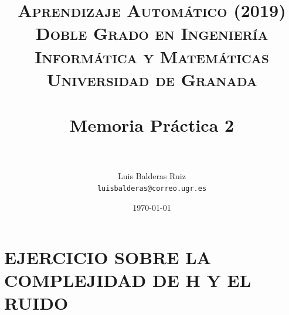 
\graphicspath{ {./images/} }
\usepackage{subcaption}
\usepackage{hyperref}
\usepackage{soul}



\title{	
\normalfont \normalsize 
\textsc{\textbf{Aprendizaje Automático (2019)} \\ Doble Grado en Ingeniería Informática y Matemáticas \\ Universidad de Granada} \\ [25pt] %
\horrule{0.5pt} \\[0.4cm] %
\huge Memoria Práctica 2 \\ %
\horrule{2pt} \\[0.5cm] %
}

\author{Luis Balderas Ruiz \\ \texttt{luisbalderas@correo.ugr.es}} 


\date{\normalsize\today} %




\maketitle %

\newpage %

\tableofcontents %

\listoffigures

\listoftables

\newpage



\section{EJERCICIO SOBRE LA COMPLEJIDAD DE H Y EL RUIDO}

